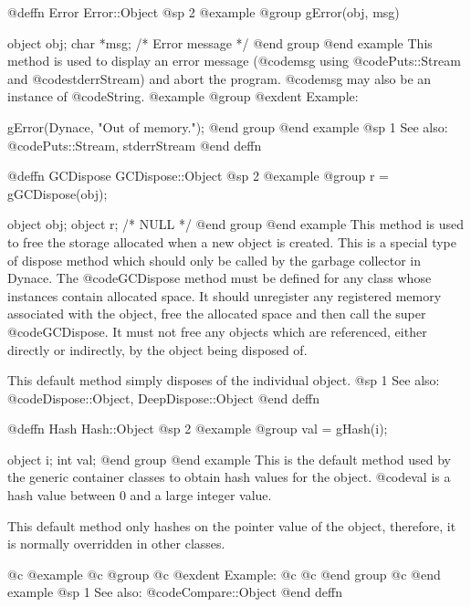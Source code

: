 @deffn {Error} Error::Object
@sp 2
@example
@group
gError(obj, msg)

object  obj;
char    *msg;  /*  Error message  */
@end group
@end example
This method is used to display an error message (@code{msg} using
@code{Puts::Stream} and @code{stderrStream}) and abort the
program.  @code{msg} may also be an instance of @code{String}.
@example
@group
@exdent Example:

gError(Dynace, "Out of memory.\n");
@end group
@end example
@sp 1
See also:  @code{Puts::Stream, stderrStream}
@end deffn













@deffn {GCDispose} GCDispose::Object
@sp 2
@example
@group
r = gGCDispose(obj);

object  obj;
object  r;     /*  NULL  */
@end group
@end example
This method is used to free the storage allocated when a new object is
created.  This is a special type of dispose method which should only be
called by the garbage collector in Dynace.  The @code{GCDispose} method
must be defined for any class whose instances contain allocated space.
It should unregister any registered memory associated with the object,
free the allocated space and then call the super @code{GCDispose}.  It
must not free any objects which are referenced, either directly or
indirectly, by the object being disposed of.

This default method simply disposes of the individual object.
@sp 1
See also:  @code{Dispose::Object, DeepDispose::Object}
@end deffn





@deffn {Hash} Hash::Object
@sp 2
@example
@group
val = gHash(i);

object  i;
int     val;
@end group
@end example
This is the default method used by the generic container classes to
obtain hash values for the object.  @code{val} is a hash value between 0
and a large integer value.

This default method only hashes on the pointer value of the object,
therefore, it is normally overridden in other classes.

@c @example
@c @group
@c @exdent Example:
@c
@c @end group
@c @end example
@sp 1
See also:  @code{Compare::Object}
@end deffn









